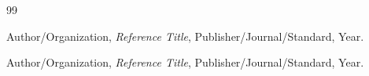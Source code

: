 
\begin{thebibliography}{99}

Author/Organization,
\emph{Reference Title},
Publisher/Journal/Standard, Year.

Author/Organization,
\emph{Reference Title},
Publisher/Journal/Standard, Year.

\end{thebibliography}
